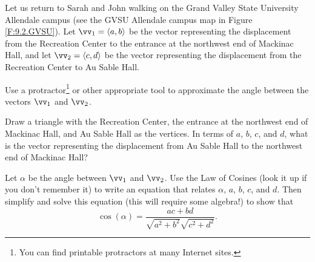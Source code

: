 \begin{pa} \label{PA:9.3}
Let us return to Sarah and John walking on the Grand Valley State University Allendale campus (see the GVSU Allendale campus map in Figure \ref{F:9.2.GVSU}). Let $\vv_1 = \langle a, b \rangle$ be the vector representing the displacement from the Recreation Center to the entrance at the northwest end of Mackinac Hall, and let ${\vv_2 = \langle c,d \rangle}$ be the vector representing the displacement from the Recreation Center to Au Sable Hall.
    \ba
    \item Use a protractor\footnote{You can find printable protractors at many Internet sites.} or other appropriate tool to approximate the angle between the vectors $\vv_1$ and $\vv_2$.

\begin{comment}

Using a protractor, I found the angle between $\vv_1$ and $\vv_2$ to be approximately $75^{\circ}$.

\end{comment}

    \item Draw a triangle with the Recreation Center, the entrance at the northwest end of Mackinac Hall, and Au Sable Hall as the vertices.  In terms of $a$, $b$, $c$, and $d$, what is the vector representing the displacement from Au Sable Hall to the northwest end of Mackinac Hall?

\begin{comment}

The vector we want is $\vv_1 - \vv_2 = \langle a-c, b-d \rangle$.

\end{comment}

    \item Let $\alpha$ be the angle between $\vv_1$ and $\vv_2$. Use the Law of Cosines (look it up if you don't remember it) to write an equation that relates $\alpha$, $a$, $b$, $c$, and $d$. Then simplify and solve this equation (this will require some algebra!) to show that
\begin{equation} \label{eq:GVSU_dot_product}
\cos(\alpha) = \frac{ac+bd}{\sqrt{a^2+b^2}\sqrt{c^2+d^2}}.
\end{equation}

\begin{comment}

\vs


\end{comment}
\end{pa}
